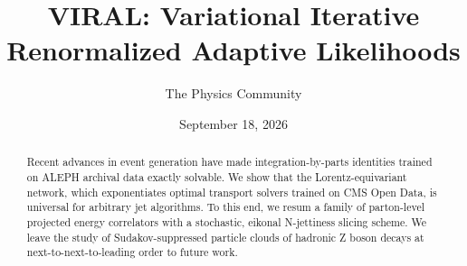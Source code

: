\documentclass[11pt]{article}
\title{VIRAL: Variational Iterative Renormalized Adaptive Likelihoods}
\author{The Physics Community}
\date{September 18, 2026}
\begin{document}
\maketitle
\begin{abstract}
Recent advances in event generation have made integration-by-parts
identities trained on ALEPH archival data exactly solvable. We show that
the Lorentz-equivariant network, which exponentiates optimal transport
solvers trained on CMS Open Data, is universal for arbitrary jet
algorithms. To this end, we resum a family of parton-level projected
energy correlators with a stochastic, eikonal N-jettiness slicing
scheme. We leave the study of Sudakov-suppressed particle clouds of
hadronic Z boson decays at next-to-next-to-leading order to future work.
\end{abstract}
\tableofcontents






\nocite{*}


\end{document}
